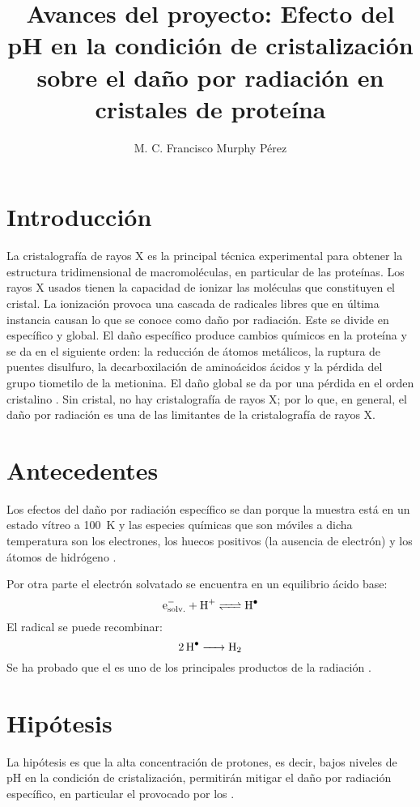 \documentclass[11pt,letterpaper]{article}
\author{M. C. Francisco Murphy Pérez}
\title{Avances del proyecto: Efecto del pH en la condición de
cristalización sobre el daño por radiación
en cristales de proteína}
\begin{document}
	\maketitle
	\section{Introducción}	
	La cristalografía de rayos X es la principal técnica experimental para obtener la estructura tridimensional de macromoléculas, en particular de las proteínas. Los rayos X usados tienen la capacidad de ionizar las moléculas que constituyen el cristal. La ionización provoca una cascada de radicales libres que en última instancia causan lo que se conoce como daño por radiación. Este se divide en específico y global. El daño específico produce cambios químicos en la proteína y se da en el siguiente orden: la reducción de átomos metálicos, la ruptura de puentes disulfuro, la decarboxilación de aminoácidos ácidos y la pérdida del grupo tiometilo de la metionina. El daño global se da por una pérdida en el orden cristalino \cite{Weik2000,Ravelli2000}. Sin cristal, no hay cristalografía de rayos X; por lo que, en general, el daño por radiación es una de las limitantes de la cristalografía de rayos X. 
	
	\section{Antecedentes}
	Los efectos del daño por radiación específico se dan porque la muestra está en un estado vítreo a \SI{100}{\kelvin} y las especies químicas que son móviles a dicha temperatura son los electrones, los huecos positivos (la ausencia de electrón) y los átomos de hidrógeno \cite{Owen2012a}. 
	
	Por otra parte el electrón solvatado se encuentra en un equilibrio ácido base:
	\begin{equation*}
		\ce{e^{-}_{solv.} + H^{+} <=> H^{.}}
	\end{equation*}
	El radical  se puede recombinar:
	\begin{equation*}
		\ce{2H^{.}      ->        H2}
	\end{equation*} 
	Se ha probado que el  es uno de los principales productos de la radiación \cite{Meents2010}.
	
	\section{Hipótesis}
	La hipótesis es que la alta concentración de protones, es decir, bajos niveles de pH en la condición de cristalización, permitirán mitigar el daño por radiación específico, en particular el provocado por los .
	
\end{document}
